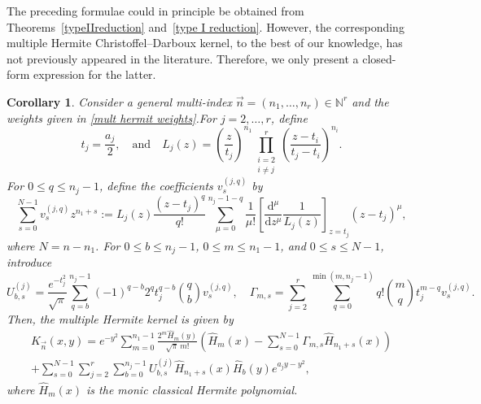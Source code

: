 \documentclass[a4paper,10pt,leqno]{amsart}
\numberwithin{equation}{section}
\newtheorem{corollary}[theorem]{Corollary}
\theoremstyle{remark}
\newcommand{\dd}{\mathrm{d}}
\begin{document}
 
The preceding formulae could in principle be obtained from Theorems~\ref{typeIIreduction} and~\ref{type I reduction}. However, the corresponding multiple Hermite Christoffel--Darboux kernel, to the best of our knowledge, has not previously appeared in the literature. Therefore, we only present a closed-form expression for the latter.



 


\begin{corollary}
\label{cor-general-Hermite-kernel}
Consider a general multi-index
\(\vec n=(n_1,\ldots,n_r)\in\mathbb N^r\) and the weights given in \eqref{mult hermit weights}.For $j=2,\ldots,r$, define
\begin{equation}\label{eq:Lj-general-Hermite}
    t_j=\frac{a_j}{2}, \quad \mbox{and} \quad L_j(z)=\left(\frac{z}{t_j}\right)^{n_1}\prod_{\substack{i=2\\ i\neq j}}^r\left(\frac{z-t_i}{t_j-t_i}\right)^{n_i}.
\end{equation}
For $0\leq q\leq n_j-1$, define the coefficients $v_s^{(j,q)}$ by
\begin{equation}\label{eq:Pi-jq}
    \sum_{s=0}^{N-1}v_s^{(j,q)}z^{n_1+s} := L_j(z) \frac{(z-t_j)^q}{q!}\sum_{\mu=0}^{n_j-1-q}\frac{1}{\mu!}\left[\frac{\dd^\mu}{\dd z^\mu}\frac{1}{L_j(z)}\right]_{z=t_j}(z-t_j)^\mu,
\end{equation}
where $N = n-n_1$.
For $0 \leq b \leq n_j-1$, $0 \leq m \leq n_1-1$, and $0 \leq s \leq N-1$, introduce
\begin{equation}\label{eq:U-Gamma-explicit}
    U^{(j)}_{b,s}=\frac{e^{-t_j^2}}{\sqrt{\pi}}\sum_{q=b}^{n_j-1}(-1)^{q-b}2^q t_j^{q-b}\binom{q}{b}v_s^{(j,q)},\quad
    \Gamma_{m,s}=\sum_{j=2}^r\sum_{q=0}^{\min(m,n_j-1)}q!\binom{m}{q}t_j^{m-q}v_s^{(j,q)}.
\end{equation}
Then, the multiple Hermite kernel is given by
\begin{multline}\label{eq:kernel-simplified-explicit}
    K_{\vec n}(x,y)=e^{-y^2}\sum_{m=0}^{n_1-1}\frac{2^m\widehat H_m(y)}{\sqrt{\pi}\,m!}\left(\widehat H_m(x)-\sum_{s=0}^{N-1}\Gamma_{m,s}\widehat H_{n_1+s}(x)\right)\\
    +\sum_{s=0}^{N-1}\sum_{j=2}^r\sum_{b=0}^{n_j-1}U^{(j)}_{b,s}\widehat H_{n_1+s}(x)\widehat H_b(y)e^{a_jy-y^2},
\end{multline}
where $\widehat H_m(x)$ is the monic classical Hermite polynomial.
\end{corollary}

 
\end{document}
